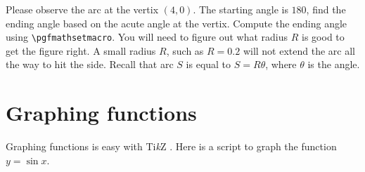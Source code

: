 \documentclass[12pt]{article}
\newcommand{\myTikZ}{Ti\textit{k}Z }
\begin{document}

Please observe the arc at the vertix $(4,0)$. The starting angle is $180$, find the
ending angle based on the acute angle at the vertix. Compute the ending angle using
\texttt{{\textbackslash}pgfmathsetmacro}. You will need to figure out what radius $R$ is good to 
get the figure right. A small radius $R$, such as $R=0.2$ will not extend the arc all the
way to hit the side. Recall that arc $S$ is equal to $S=R \theta$, where $\theta$ is the angle.




\section{Graphing functions}
Graphing functions is easy with \myTikZ.  Here is a script to graph the function $y = \sin x$.
\end{document}
